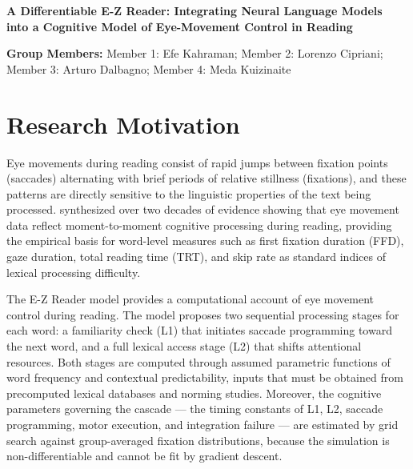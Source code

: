 \documentclass[12pt]{article}
\begin{document}
\newpage

\setcounter{page}{1}
\pagestyle{fancy}

\begin{center}
  \textbf{A Differentiable E-Z Reader: Integrating Neural Language Models\\
  into a Cognitive Model of Eye-Movement Control in Reading}
\end{center}

\vspace{6pt}
\noindent\textbf{Group Members:}\;
Member 1: Efe Kahraman;
Member 2: Lorenzo Cipriani;
Member 3: Arturo Dalbagno;
Member 4: Meda Kuizinaite{\hspace{2.2cm}}

\vspace{12pt}

\section{Research Motivation}

Eye movements during reading consist of rapid jumps between fixation points
(saccades) alternating with brief periods of relative stillness (fixations),
and these patterns are directly sensitive to the linguistic properties of the
text being processed. \citet{rayner1998eye} synthesized over two decades of
evidence showing that eye movement data reflect moment-to-moment cognitive
processing during reading, providing the empirical basis for word-level
measures such as first fixation duration (FFD), gaze duration, total reading
time (TRT), and skip rate as standard indices of lexical processing
difficulty.

The E-Z Reader model \citep{reichle1998toward} provides a computational
account of eye movement control during reading. The model proposes two
sequential processing stages for each word: a familiarity check (L1) that
initiates saccade programming toward the next word, and a full lexical access
stage (L2) that shifts attentional resources. Both stages are computed through
assumed parametric functions of word frequency and contextual predictability,
inputs that must be obtained from precomputed lexical databases and norming
studies. Moreover, the cognitive parameters governing the cascade --- the
timing constants of L1, L2, saccade programming, motor execution, and
integration failure --- are estimated by grid search against group-averaged
fixation distributions, because the simulation is non-differentiable and
cannot be fit by gradient descent.
\end{document}
